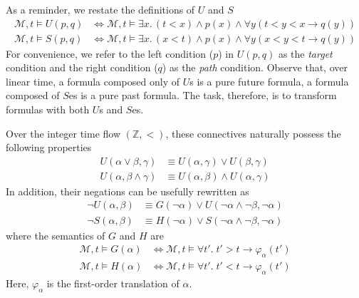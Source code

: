 \documentclass[a4paper,UKenglish,cleveref, autoref, thm-restate, numberwithinsect]{lipics-v2021}
\begin{document}
As a reminder, we restate the definitions of $U$ and $S$
\begin{equation*}
    \begin{aligned}
        \mathcal{M}, t \vDash U(p, q) &\Longleftrightarrow \mathcal{M}, t \vDash \exists x.\, (t < x) \land p(x) \land \forall y \left( t < y < x \to q\left( y \right) \right)\\
        \mathcal{M}, t \vDash S(p, q) &\Longleftrightarrow \mathcal{M}, t \vDash \exists x.\, (x < t) \land p(x) \land \forall y \left( x < y < t \to q\left( y \right) \right)
    \end{aligned}
\end{equation*}
For convenience, we refer to the left condition ($p$) in $U(p, q)$ as the \textit{target} condition and the right condition ($q$) as the \textit{path} condition. Observe that, over linear time, a formula composed only of $U$s is a pure future formula, a formula composed of $S$es is a pure past formula. The task, therefore, is to transform formulas with both $U$s and $S$es.

Over the integer time flow $(\mathbb{Z}, <)$, these connectives naturally possess the following properties
\begin{equation}
    \label{eq:or-and-S-U}
    \begin{aligned}
        U(\alpha \lor \beta, \gamma) &\equiv U(\alpha, \gamma) \lor U(\beta, \gamma)\\
        U(\alpha, \beta \land \gamma) &\equiv U(\alpha, \beta) \land U(\alpha, \gamma)
    \end{aligned}
\end{equation}
In addition, their negations can be usefully rewritten as
\begin{equation*}
    \begin{aligned}
        \lnot U(\alpha, \beta) &\equiv G(\lnot \alpha) \lor U(\lnot \alpha \land \lnot \beta, \lnot \alpha) \\
        \lnot S(\alpha, \beta) &\equiv H(\lnot \alpha) \lor S(\lnot \alpha \land \lnot \beta, \lnot \alpha)
    \end{aligned}
\end{equation*}
where the semantics of $G$ and $H$ are
\begin{equation*}
    \begin{aligned}
        \mathcal{M}, t \vDash G(\alpha) &\Longleftrightarrow \mathcal{M}, t \vDash \forall t'.\; t' > t \to \varphi_\alpha(t') \\
        \mathcal{M}, t \vDash H(\alpha) &\Longleftrightarrow \mathcal{M}, t \vDash \forall t'.\; t' < t \to \varphi_\alpha(t')
    \end{aligned}
\end{equation*}
Here, $\varphi_\alpha$ is the first-order translation of $\alpha$.
\end{document}
